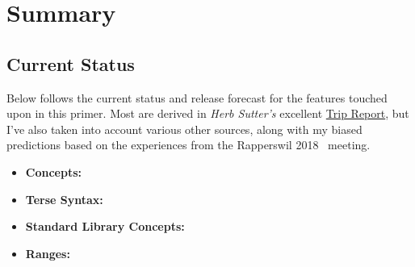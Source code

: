 \section{Summary} \label{sec:summary}

\subsection*{Current Status}

    Below follows the current status and release forecast for the features touched upon in this primer. Most are derived in \emph{Herb Sutter's} excellent \href{https://herbsutter.com/2018/07/02/trip-report-summer-iso-c-standards-meeting-rapperswil/}{Trip Report}, but I've also taken into account various other sources, along with my biased predictions based on the experiences from the Rapperswil 2018 \Cpp\ meeting.

    \begin{itemize}
        \item{\textbf{Concepts:}}
        \item{\textbf{Terse Syntax:}}
        \item{\textbf{Standard Library Concepts:}}
        \item{\textbf{Ranges:}}
    \end{itemize}
